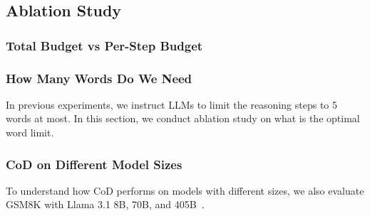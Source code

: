 \subsection{Ablation Study}
\subsubsection{Total Budget vs Per-Step Budget}


\subsubsection{How Many Words Do We Need}
In previous experiments, we instruct LLMs to limit the reasoning steps to 5 words at most. In this section, we conduct ablation study on what is the optimal word limit. 

\subsubsection{CoD on Different Model Sizes}
To understand how CoD performs on models with different sizes, we also evaluate GSM8K with Llama 3.1 8B, 70B, and 405B~\cite{llama3.1}.
